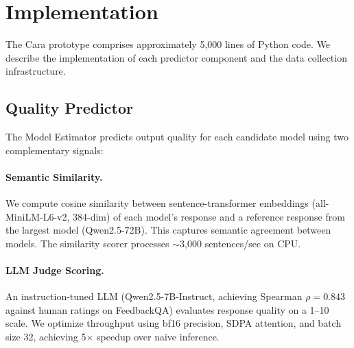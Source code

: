\documentclass[letterpaper, anonymous, twocolumn, 10pt]{article}
\begin{document}











\section{Implementation} \label{section:implementation}

The Cara prototype comprises approximately 5,000 lines of Python code. We describe the implementation of each predictor component and the data collection infrastructure.

\subsection{Quality Predictor}

The Model Estimator predicts output quality for each candidate model using two complementary signals:

\paragraph{Semantic Similarity.} We compute cosine similarity between sentence-transformer embeddings (all-MiniLM-L6-v2, 384-dim) of each model's response and a reference response from the largest model (Qwen2.5-72B). This captures semantic agreement between models. The similarity scorer processes $\sim$3,000 sentences/sec on CPU.

\paragraph{LLM Judge Scoring.} An instruction-tuned LLM (Qwen2.5-7B-Instruct, achieving Spearman $\rho=0.843$ against human ratings on FeedbackQA) evaluates response quality on a 1--10 scale. We optimize throughput using bf16 precision, SDPA attention, and batch size 32, achieving 5$\times$ speedup over naive inference.
\end{document}
